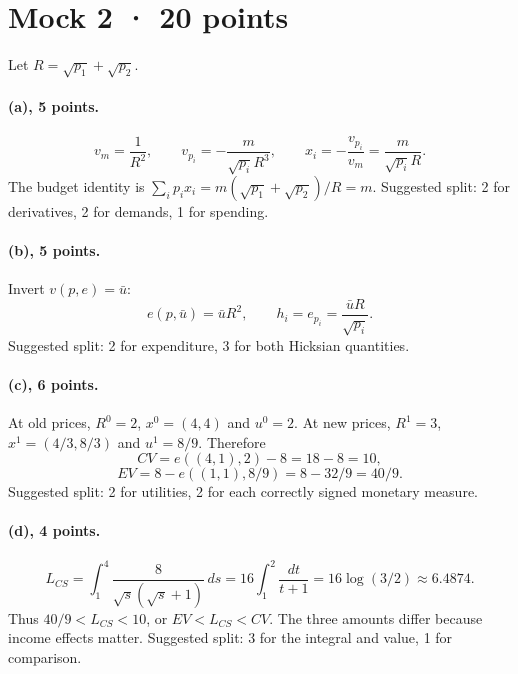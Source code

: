 \section*{Mock 2 · 20 points}
Let $R=\sqrt{p_1}+\sqrt{p_2}$.

\paragraph{(a), 5 points.}
\[
 v_m=\frac1{R^2},\qquad v_{p_i}=-\frac{m}{\sqrt{p_i}R^3},\qquad
 x_i=-\frac{v_{p_i}}{v_m}=\frac{m}{\sqrt{p_i}R}.
\]
The budget identity is $\sum_i p_ix_i=m(\sqrt{p_1}+\sqrt{p_2})/R=m$.
Suggested split: 2 for derivatives, 2 for demands, 1 for spending.

\paragraph{(b), 5 points.}
Invert $v(p,e)=\bar u$:
\[
 e(p,\bar u)=\bar uR^2,\qquad
 h_i=e_{p_i}=\frac{\bar uR}{\sqrt{p_i}}.
\]
Suggested split: 2 for expenditure, 3 for both Hicksian quantities.

\paragraph{(c), 6 points.}
At old prices, $R^0=2$, $x^0=(4,4)$ and $u^0=2$. At new prices,
$R^1=3$, $x^1=(4/3,8/3)$ and $u^1=8/9$. Therefore
\[
 CV=e((4,1),2)-8=18-8=10,
\]
\[
 EV=8-e((1,1),8/9)=8-32/9=40/9.
\]
Suggested split: 2 for utilities, 2 for each correctly signed monetary measure.

\paragraph{(d), 4 points.}
\[
 L_{CS}=\int_1^4\frac8{\sqrt s(\sqrt s+1)}\,ds
       =16\int_1^2\frac{dt}{t+1}
       =16\log(3/2)\approx6.4874.
\]
Thus $40/9<L_{CS}<10$, or $EV<L_{CS}<CV$. The three amounts differ because
income effects matter. Suggested split: 3 for the integral and value, 1 for comparison.
